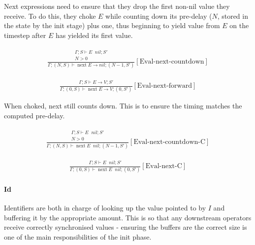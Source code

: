 \documentclass{scrartcl}
\DeclareMathOperator{\nextop}{next}
\DeclareMathOperator{\ceval}{\overset{C}{\rightarrow}}
\begin{document}
    Next expressions need to ensure that they drop the first non-nil value they receive. To do this, they choke $E$ while counting down its pre-delay ($N$, stored in the state by the init stage) plus one, thus beginning to yield value from $E$ on the timestep after $E$ has yielded its first value.
    
    \begin{align*}
    \frac{
        \begin{matrix}
        \Gamma; S \vdash E \ceval nil; S' \\
        N > 0
        \end{matrix}
    }{
        \Gamma; (N, S) \vdash \nextop E \rightarrow nil; (N-1, S')
    }[\text{Eval-next-countdown}]
    \end{align*}
    
    \begin{align*}
    \frac{
        \begin{matrix}
        \Gamma; S \vdash E \rightarrow V; S'
        \end{matrix}
    }{
        \Gamma; (0, S) \vdash \nextop E \rightarrow V; (0, S')
    }[\text{Eval-next-forward}]
    \end{align*}
    
    When choked, next still counts down. This is to ensure the timing matches the computed pre-delay.
    
    \begin{align*}
    \frac{
        \begin{matrix}
        \Gamma; S \vdash E \ceval nil; S' \\
        N > 0
        \end{matrix}
    }{
        \Gamma; (N, S) \vdash \nextop E \ceval nil; (N-1, S')
    }[\text{Eval-next-countdown-C}]
    \end{align*}
    
    \begin{align*}
    \frac{
        \begin{matrix}
        \Gamma; S \vdash E \ceval nil; S'
        \end{matrix}
    }{
        \Gamma; (0, S) \vdash \nextop E \ceval nil; (0, S')
    }[\text{Eval-next-C}]
    \end{align*}
    
    \paragraph{Id}
    
    Identifiers are both in charge of looking up the value pointed to by $I$ and buffering it by the appropriate amount. This is so that any downstream operators receive correctly synchronised values - ensuring the buffers are the correct size is one of the main responsibilities of the init phase.
    
\end{document}
